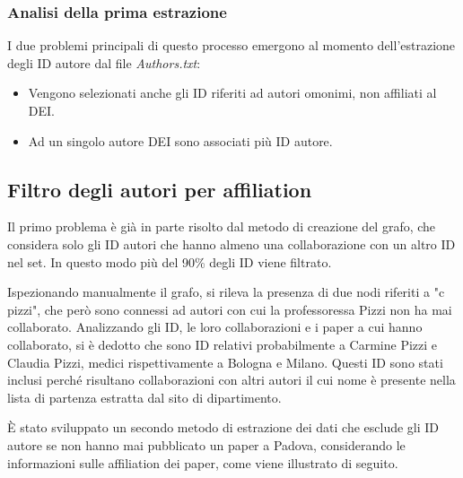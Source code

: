\documentclass[12pt,a4paper,twoside]{report}
\begin{document}
%

\subsubsection{Analisi della prima estrazione}\label{ssc:analisiuno}

I due problemi principali di questo processo emergono al momento dell'estrazione degli ID autore dal
file \textit{Authors.txt}:

\begin{itemize}[noitemsep, topsep=0pt]
\item
Vengono selezionati anche gli ID riferiti ad autori omonimi, non affiliati al DEI.
\item
Ad un singolo autore DEI sono associati più ID autore.
\end{itemize}

\subsection{Filtro degli autori per affiliation} \label{ssc:padovani}
Il primo problema è già in parte risolto dal metodo di creazione del grafo, che considera solo gli
ID autori che hanno almeno una collaborazione con un altro ID nel set. In questo modo più del 90\%
degli ID viene filtrato.

Ispezionando manualmente il grafo, si rileva la presenza di due nodi riferiti a "c pizzi", che però
sono connessi ad autori con cui la professoressa Pizzi non ha mai collaborato. Analizzando gli ID,
le loro collaborazioni e i paper a cui hanno collaborato, si è dedotto che sono ID relativi
probabilmente a Carmine Pizzi e Claudia Pizzi, medici rispettivamente a Bologna e Milano. Questi ID
sono stati inclusi perché risultano collaborazioni con altri autori il cui nome è presente nella
lista di partenza estratta dal sito di dipartimento.

È stato sviluppato un secondo metodo di estrazione dei dati che esclude gli ID autore se non hanno
mai pubblicato un paper a Padova, considerando le informazioni sulle affiliation dei paper, come
viene illustrato di seguito.
\end{document}
